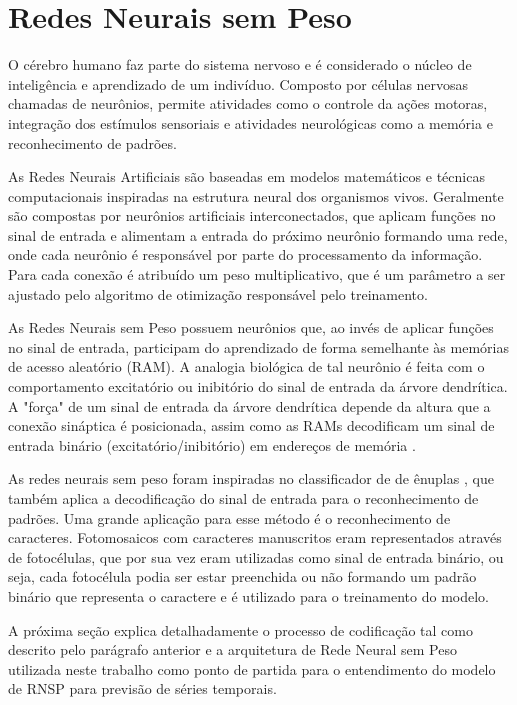 \chapter{Redes Neurais sem Peso} \label{chap:03}
O cérebro humano faz parte do sistema nervoso e é considerado o núcleo de inteligência e aprendizado de um indivíduo. Composto por células nervosas chamadas de neurônios, permite atividades como o controle da ações motoras, integração dos estímulos sensoriais e atividades neurológicas como a memória e reconhecimento de padrões.

As Redes Neurais Artificiais são baseadas em modelos matemáticos e técnicas computacionais inspiradas na estrutura neural dos organismos vivos. Geralmente são compostas por neurônios artificiais interconectados, que aplicam funções no sinal de entrada e alimentam a entrada do próximo neurônio formando uma rede, onde cada neurônio é responsável por parte do processamento da informação. Para cada conexão é atribuído um peso multiplicativo, que é um parâmetro a ser ajustado pelo algoritmo de otimização responsável pelo treinamento.

As Redes Neurais sem Peso possuem neurônios que, ao invés de aplicar funções no sinal de entrada, participam do aprendizado de forma semelhante às memórias de acesso aleatório (RAM). A analogia biológica de tal neurônio é feita com o comportamento excitatório ou inibitório do sinal de entrada da árvore dendrítica. A "força" de um sinal de entrada da árvore dendrítica depende da altura que a conexão sináptica é posicionada, assim como as RAMs decodificam um sinal de entrada binário (excitatório/inibitório) em endereços de memória \cite{briefintrownn}.

As redes neurais sem peso foram inspiradas no classificador de de ênuplas \cite{bledsoe&browning}, que também aplica a decodificação do sinal de entrada para o reconhecimento de padrões. Uma grande aplicação para esse método é o reconhecimento de caracteres. Fotomosaicos com caracteres manuscritos eram representados através de fotocélulas, que por sua vez eram utilizadas como sinal de entrada binário, ou seja, cada fotocélula podia ser estar preenchida ou não formando um padrão binário que representa o caractere e é utilizado para o treinamento do modelo.

A próxima seção explica detalhadamente o processo de codificação tal como descrito pelo parágrafo anterior e a arquitetura de Rede Neural sem Peso utilizada neste trabalho como ponto de partida para o entendimento do modelo de RNSP para previsão de séries temporais.


